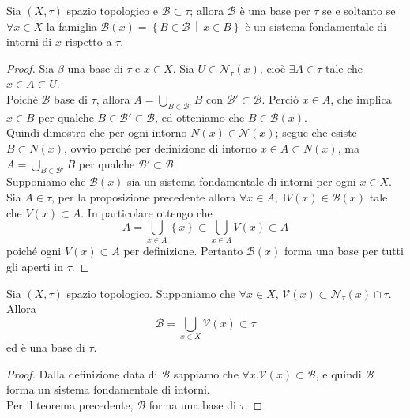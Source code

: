 \begin{theorem}
	Sia $(X,\tau)$ spazio topologico e $\mathcal{B} \subset \tau$; allora $\mathcal{B}$ è una base per $\tau$ se e soltanto se $\forall x \in X$ la famiglia $\mathcal{B}(x) = \left\{B \in \mathcal{B} \,\middle|\, x \in B \right\}$ è un sistema fondamentale di intorni di $x$ rispetto a $\tau$.
\end{theorem}
\begin{proof}
	Sia $\beta$ una base di $\tau$ e $x \in X$. Sia $U \in \mathcal{N}_\tau(x)$, cioè $\exists A \in \tau$ tale che $x \in A \subset U$. \\ Poiché $\mathcal{B}$ base di $\tau$, allora $A = \bigcup_{B \in \mathcal{B}'} B$ con $\mathcal{B}' \subset \mathcal{B}$. Perciò $x \in A$, che implica $x \in B$ per qualche $B \in \mathcal{B}' \subset \mathcal{B}$, ed otteniamo che $B \in \mathcal{B}(x)$. \\ Quindi dimostro che per ogni intorno $N(x) \in \mathcal{N}(x)$; segue che esiste $B \subset N(x)$, ovvio perché per definizione di intorno $x \in A \subset N(x)$, ma $A = \bigcup_{B \in \mathcal{B}'} B$ per qualche $\mathcal{B}' \subset \mathcal{B}$.\\  
	
	Supponiamo che $\mathcal{B}(x)$ sia un sistema fondamentale di intorni per ogni $x \in X$. Sia $A \in \tau$, per la proposizione precedente allora $\forall x \in A, \exists V(x) \in \mathcal{B}(x)$ tale che $V(x) \subset A$. In particolare ottengo che
	\begin{equation*}
		A = \bigcup_{x \in A} \left\{x\right\} \subset \bigcup_{x \in A} V(x) \subset A
	\end{equation*} 
	poiché ogni $V(x) \subset A$ per definizione. Pertanto $\mathcal{B}(x)$ forma una base per tutti gli aperti in $\tau$.
\end{proof}

\begin{corollary}
	\label{crl:base_from_sfi}
	Sia $(X,\tau)$ spazio topologico. Supponiamo che $\forall x \in X$, $\mathcal{V}(x) \subset \mathcal{N}_\tau(x) \cap \tau$. Allora 
	\begin{equation*}
		\mathcal{B} = \bigcup_{x \in X} \mathcal{V}(x) \subset \tau
	\end{equation*}
	ed è una base di $\tau$.
\end{corollary}
\begin{proof}
	Dalla definizione data di $\mathcal{B}$ sappiamo che $\forall x . \mathcal{V}(x) \subset \mathcal{B}$, e quindi $\mathcal{B}$ forma un sistema fondamentale di intorni. \\ Per il teorema precedente, $\mathcal{B}$ forma una base di $\tau$.
\end{proof}

